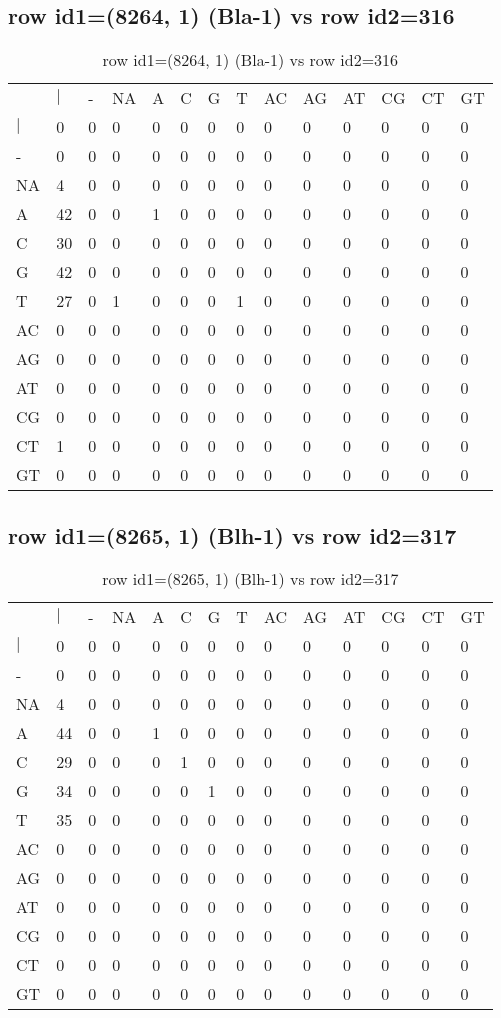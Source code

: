 \subsection{row id1=(8264, 1) (Bla-1) vs row id2=316}
\begin{center}
\begin{longtable}{|l|l|l|l|l|l|l|l|l|l|l|l|l|l|}
\caption{row id1=(8264, 1) (Bla-1) vs row id2=316} \label{table_dm410}\\
\hline
\\
\hline
&$|$&-&NA&A&C&G&T&AC&AG&AT&CG&CT&GT\\
$|$&0&0&0&0&0&0&0&0&0&0&0&0&0\\
-&0&0&0&0&0&0&0&0&0&0&0&0&0\\
NA&4&0&0&0&0&0&0&0&0&0&0&0&0\\
A&42&0&0&1&0&0&0&0&0&0&0&0&0\\
C&30&0&0&0&0&0&0&0&0&0&0&0&0\\
G&42&0&0&0&0&0&0&0&0&0&0&0&0\\
T&27&0&1&0&0&0&1&0&0&0&0&0&0\\
AC&0&0&0&0&0&0&0&0&0&0&0&0&0\\
AG&0&0&0&0&0&0&0&0&0&0&0&0&0\\
AT&0&0&0&0&0&0&0&0&0&0&0&0&0\\
CG&0&0&0&0&0&0&0&0&0&0&0&0&0\\
CT&1&0&0&0&0&0&0&0&0&0&0&0&0\\
GT&0&0&0&0&0&0&0&0&0&0&0&0&0\\
\hline
\end{longtable}
\end{center}

\subsection{row id1=(8265, 1) (Blh-1) vs row id2=317}
\begin{center}
\begin{longtable}{|l|l|l|l|l|l|l|l|l|l|l|l|l|l|}
\caption{row id1=(8265, 1) (Blh-1) vs row id2=317} \label{table_dm412}\\
\hline
\\
\hline
&$|$&-&NA&A&C&G&T&AC&AG&AT&CG&CT&GT\\
$|$&0&0&0&0&0&0&0&0&0&0&0&0&0\\
-&0&0&0&0&0&0&0&0&0&0&0&0&0\\
NA&4&0&0&0&0&0&0&0&0&0&0&0&0\\
A&44&0&0&1&0&0&0&0&0&0&0&0&0\\
C&29&0&0&0&1&0&0&0&0&0&0&0&0\\
G&34&0&0&0&0&1&0&0&0&0&0&0&0\\
T&35&0&0&0&0&0&0&0&0&0&0&0&0\\
AC&0&0&0&0&0&0&0&0&0&0&0&0&0\\
AG&0&0&0&0&0&0&0&0&0&0&0&0&0\\
AT&0&0&0&0&0&0&0&0&0&0&0&0&0\\
CG&0&0&0&0&0&0&0&0&0&0&0&0&0\\
CT&0&0&0&0&0&0&0&0&0&0&0&0&0\\
GT&0&0&0&0&0&0&0&0&0&0&0&0&0\\
\hline
\end{longtable}
\end{center}

